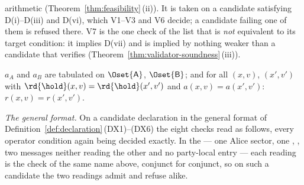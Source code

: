 \begin{definition}
\begin{description}[leftmargin=3.0em,style=nextline]
  arithmetic (Theorem~\ref{thm:feasibility}\,(ii)). It is taken on a
  candidate satisfying D(i)--D(iii) and D(vi), which V1--V3 and V6 decide; a
  candidate failing one of them is refused there. V7 is the one check of the
  list that
  is \emph{not} equivalent to its target condition: it implies D(vii) and is
  implied by nothing weaker than a candidate that verifies
  (Theorem~\ref{thm:validator-soundness}\,(iii)).
\item[V8 (party computability)] $a_A$ and $a_B$ are tabulated on
  $\Oset{\mathsf A}$, $\Oset{\mathsf B}$; and for all $(x,v)$, $(x',v')$ with
  $\rd{\hold}(x,v)=\rd{\hold}(x',v')$ and $a(x,v)=a(x',v')$:
  $r(x,v)=r(x',v')$.
\end{description}

\emph{The general format.} On a candidate declaration in the general format
of Definition~\ref{def:declaration}\,(DX1)--(DX6) the eight checks read as
follows, every operator condition again being decided exactly. In the
 --- one Alice sector, one ,
, two messages neither reading the other and no party-local
entry --- each reading is the check of the
same name above, conjunct for conjunct, so on such a candidate the two
readings admit and refuse alike.


\end{definition}
